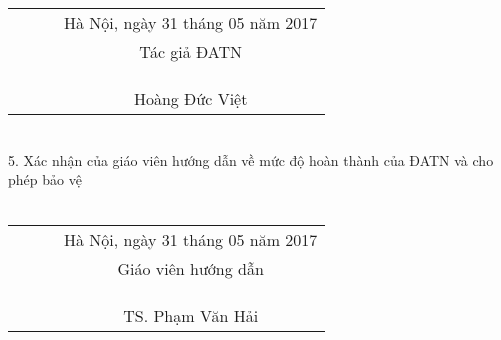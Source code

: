 \begin{acknowledgementslong}
\begin{tabular}{l l l c }
    \textbf{ } \hspace*{35pt} \textbf{ } &  \textbf{ } \hspace*{35pt} \textbf{ } & \textbf{ } \hspace*{35pt} \textbf{ } & Hà Nội, ngày 31 tháng 05 năm 2017 \\ 
    \textbf{ } \hspace*{35pt} \textbf{ } &  \textbf{ } \hspace*{35pt} \textbf{ } & \textbf{ } \hspace*{35pt} \textbf{ } & Tác giả ĐATN \\
    \\
    \\
    \\
    \textbf{ } \hspace*{35pt} \textbf{ } &  \textbf{ } \hspace*{35pt} \textbf{ } & \textbf{ } \hspace*{35pt} \textbf{ } & Hoàng Đức Việt
    \end{tabular}\\
    
5. Xác nhận của giáo viên hướng dẫn về mức độ hoàn thành của ĐATN và cho phép bảo vệ \\\\[5cm]
\begin{tabular}{l l l c }
    \textbf{ } \hspace*{35pt} \textbf{ } &  \textbf{ } \hspace*{35pt} \textbf{ } & \textbf{ } \hspace*{35pt} \textbf{ } & Hà Nội, ngày 31 tháng 05 năm 2017 \\ 
    \textbf{ } \hspace*{35pt} \textbf{ } &  \textbf{ } \hspace*{35pt} \textbf{ } & \textbf{ } \hspace*{35pt} \textbf{ } & Giáo viên hướng dẫn \\
    \\
    \\
    \\
    \textbf{ } \hspace*{35pt} \textbf{ } &  \textbf{ } \hspace*{35pt} \textbf{ } & \textbf{ } \hspace*{35pt} \textbf{ } & TS. Phạm Văn Hải
    \end{tabular}\\
    
\end{acknowledgementslong}
  